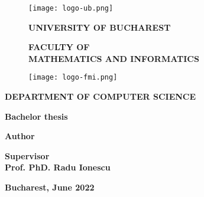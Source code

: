 \begin{titlepage}


\begin{figure}[!htb]
    \centering
    \begin{minipage}{0.2\textwidth}
        \texttt{[image: logo-ub.png]}
    \end{minipage}
    \begin{minipage}{0.5\textwidth}
        \large
        \vspace{0.2cm}
        \begin{center}
            \textbf{UNIVERSITY OF BUCHAREST}
        \end{center}
        \vspace{0.3cm}
        \begin{center}
            \textbf{
                FACULTY OF \\
                MATHEMATICS AND INFORMATICS
            }
        \end{center}
    \end{minipage}
    \begin{minipage}{0.2\textwidth}
        \texttt{[image: logo-fmi.png]}
    \end{minipage}
\end{figure}

\begin{center}
\textbf{DEPARTMENT OF COMPUTER SCIENCE}
\end{center}

\vspace{1cm}

\begin{center}
\Large \textbf{Bachelor thesis}
\end{center}

\begin{center}
\huge \textbf{\MakeUppercase{\@title}}
\end{center}

\vspace{3cm}

\begin{center}
\large \textbf{Author \\ \@author}
\end{center}

\vspace{0.25cm}

\begin{center}
\large \textbf{Supervisor \\ Prof. PhD. Radu Ionescu}
\end{center}

\vspace{2cm}

\begin{center}
\Large \textbf{Bucharest, June 2022}
\end{center}
\end{titlepage}